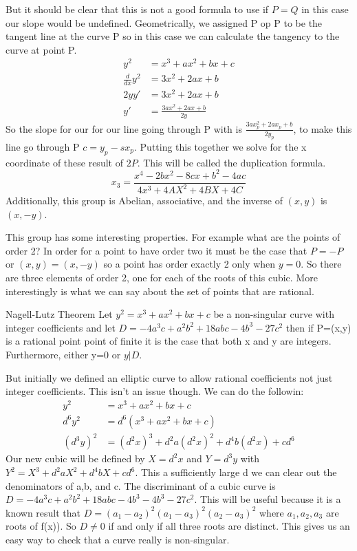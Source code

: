 \documentclass{article}
\begin{document}
But it should be clear that this is not a good formula to use if $P = Q$ in this case our slope would be undefined. Geometrically, we assigned P op P to be the tangent line at the curve P so in this case we can calculate the tangency to the curve at point P. 
\begin{align}
    y^2 &= x^3 + ax^2 + bx + c \\
    \frac{d}{dx} y^2 &= 3x^2 + 2ax + b \\
    2 y y' &= 3x^2 + 2ax + b \\
    y' &= \frac{3ax^2 + 2ax + b}{2y}
\end{align}
So the slope for our for our line going through P with is $\frac{3ax_p^2 + 2ax_p + b}{2y_p}$, to make this line go through P $c  = y_p - s x_p$. Putting this together we solve for the x coordinate of these result of $2P$. This will be called the duplication formula. 
\begin{equation}
    \tag{Duplication formula}
    x_3 = \frac{x^4 - 2bx^2 - 8cx + b^2 - 4ac}{4x^3 + 4AX^2 + 4BX + 4C}
\end{equation}
Additionally, this group is Abelian, associative, and the inverse of $(x, y)$ is $(x, -y)$. 


This group has some interesting properties. For example what are the points of order 2? In order for a point to have order two it must be the case that $P = -P$ or $(x,y) = (x, -y)$ so a point has order exactly 2 only when  $y = 0$. So there are three elements of order 2, one for each of the roots of this cubic. More interestingly is what we can say about the set of points that are rational. 
\begin{theorem}{Nagell-Lutz Theorem}
    Let $y^2 = x^3 + ax^2 + bx + c$ be a non-singular curve with integer coefficients and let $D = -4a^3c + a^2b^2 + 18abc - 4b^3 - 27c^2$ then if P=(x,y) is a rational point point of finite it is the case that both x and y are integers. Furthermore, either y=0 or $ y | D$.
\end{theorem}
But initially we defined an elliptic curve to allow rational coefficients not just integer coefficients. This isn't an issue though. We can do the followin:
\begin{align}
    y^2 &= x^3 + ax^2 + bx + c \\
    d^6 y^2 &= d^6( x^3 + ax^2 + bx + c) \\
    (d^3 y)^2 &= (d^2 x)^3 + d^2 a ( d^2 x)^2 + d^4 b ( d^2 x) + c d^6
\end{align}
Our new cubic will be defined by $X = d^2 x$ and $Y = d^3 y$ with $Y^2 = X^3 + d^2 a X^2 + d^4 b X + c d^6$. This a sufficiently large d we can clear out the denominators of a,b, and c. 
The  discriminant of a cubic curve is $D = -4a^3 c + a^2 b^2 + 18abc - 4b^3 - 4b^3 - 27c^2$. This will be useful because it is a known result that $D = (a_1 - a_2)^2 ( a_1 - a_3)^2 (a_2 - a_3)^2$ where $a_1, a_2, a_3$ are roots of f(x)\cite{silverman1992rational}). So $D \neq 0 $ if and only if all three roots are distinct.  This gives us an easy way to check that a curve really is non-singular. 
\end{document}
